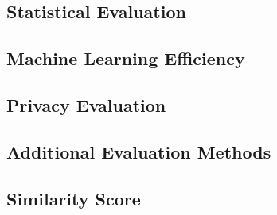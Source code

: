 \subsection{Statistical Evaluation}
\label{ch:preliminaries-evaluationOfSyntheticTabularData-statisticalEvaluation}

\subsection{Machine Learning Efficiency}
\label{ch:preliminaries-evaluationOfSyntheticTabularData-machineLearningEfficiency}

\subsection{Privacy Evaluation}
\label{ch:preliminaries-evaluationOfSyntheticTabularData-privacyEvaluation}


\subsection*{Additional Evaluation Methods}
\label{ch:preliminaries-evaluationOfSyntheticTabularData-otherMetrics}


\subsection{Similarity Score}






